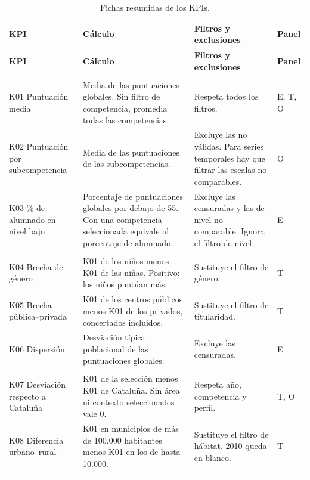 \documentclass[12pt, a4paper, oneside]{report}
\begin{document}
{\small{}\renewcommand{\arraystretch}{1.1}
\begin{longtable}{@{} >{\raggedright\arraybackslash}p{2.6cm} p{5.9cm} p{4.3cm} >{\raggedright\arraybackslash}p{1.1cm} @{}}
\toprule
\textbf{KPI} & \textbf{Cálculo} & \textbf{Filtros y exclusiones} & \textbf{Panel} \\ \midrule
\endfirsthead
\toprule
\textbf{KPI} & \textbf{Cálculo} & \textbf{Filtros y exclusiones} & \textbf{Panel} \\ \midrule
\endhead
\bottomrule
\caption{Fichas resumidas de los KPIs.}\label{tab:fichas_kpis}
\endlastfoot
\multicolumn{4}{@{}l}{\textit{Rendimiento académico}} \\
K01 Puntuación media & Media de las puntuaciones globales. Sin filtro de competencia, promedia todas las competencias. & Respeta todos los filtros. & E, T, O \\ \addlinespace
K02 Puntuación por subcompetencia & Media de las puntuaciones de las subcompetencias. & Excluye las no válidas. Para series temporales hay que filtrar las escalas no comparables. & O \\ \addlinespace
K03 \% de alumnado en nivel bajo & Porcentaje de puntuaciones globales por debajo de 55. Con una competencia seleccionada equivale al porcentaje de alumnado. & Excluye las censuradas y las de nivel no comparable. Ignora el filtro de nivel. & E \\ \addlinespace
\multicolumn{4}{@{}l}{\textit{Equidad e inclusión}} \\
K04 Brecha de género & K01 de los niños menos K01 de las niñas. Positivo: los niños puntúan más. & Sustituye el filtro de género. & T \\ \addlinespace
K05 Brecha pública--privada & K01 de los centros públicos menos K01 de los privados, concertados incluidos. & Sustituye el filtro de titularidad. & T \\ \addlinespace
K06 Dispersión & Desviación típica poblacional de las puntuaciones globales. & Excluye las censuradas. & E \\ \addlinespace
\multicolumn{4}{@{}l}{\textit{Territorio y entorno}} \\
K07 Desviación respecto a Cataluña & K01 de la selección menos K01 de Cataluña. Sin área ni contexto seleccionados vale 0. & Respeta año, competencia y perfil. & T, O \\ \addlinespace
K08 Diferencia urbano--rural & K01 en municipios de más de 100.000 habitantes menos K01 en los de hasta 10.000. & Sustituye el filtro de hábitat. 2010 queda en blanco. & T \\ \addlinespace

\end{longtable}}
\end{document}
